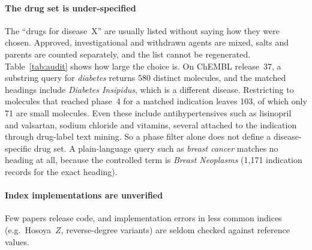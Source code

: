 \documentclass[preprint,12pt]{elsarticle}
\begin{document}
\paragraph{The drug set is under-specified} The ``drugs for disease~X'' are usually listed without saying how they were chosen. Approved, investigational and withdrawn agents are mixed, salts and parents are counted separately, and the list cannot be regenerated. Table~\ref{tab:audit} shows how large the choice is. On ChEMBL release~37, a substring query for \emph{diabetes} returns 580 distinct molecules, and the matched headings include \emph{Diabetes Insipidus}, which is a different disease. Restricting to molecules that reached phase~4 for a matched indication leaves 103, of which only 71 are small molecules. Even these include antihypertensives such as lisinopril and valsartan, sodium chloride and vitamins, several attached to the indication through drug-label text mining. So a phase filter alone does not define a disease-specific drug set. A plain-language query such as \emph{breast cancer} matches no heading at all, because the controlled term is \emph{Breast Neoplasms} (1{,}171 indication records for the exact heading).

\paragraph{Index implementations are unverified} Few papers release code, and implementation errors in less common indices (e.g.\ Hosoya~$Z$, reverse-degree variants) are seldom checked against reference values.
\end{document}
